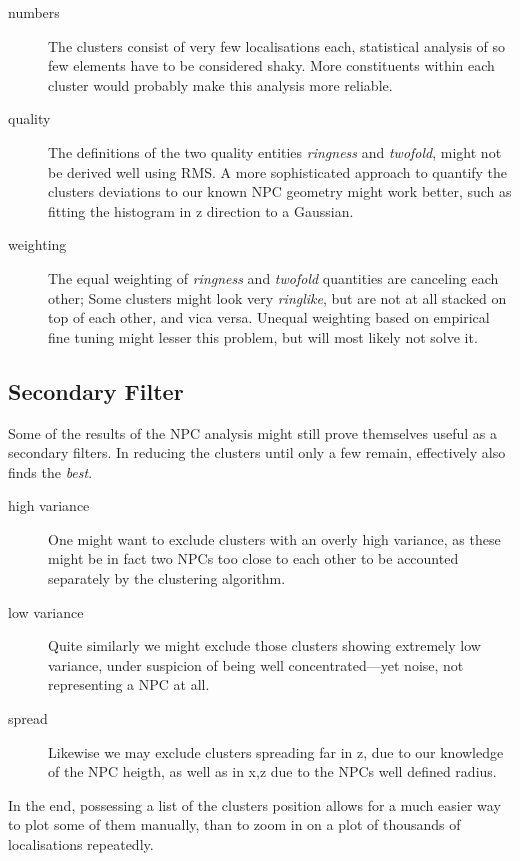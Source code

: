 \documentclass[11pt, a4paper, oneside, twocolumn]{report}
\newcommand{\e}{\emph}
\begin{document}
\begin{description}
\item [numbers] The clusters consist of very few localisations each,
  statistical analysis of so few elements have to be considered
  shaky. More constituents within each cluster would probably make
  this analysis more reliable.
\item [quality] The definitions of the two quality entities
  \e{ringness} and \e{twofold}, might not be derived well using RMS. A
  more sophisticated approach to quantify the clusters deviations to
  our known NPC geometry might work better, such as fitting the
  histogram in z direction to a Gaussian.
\item [weighting] The equal weighting of \e{ringness} and \e{twofold}
  quantities are canceling each other; Some clusters might look very
  \e{ringlike}, but are not at all stacked on top of each other, and
  vica versa. Unequal weighting based on empirical fine tuning might
  lesser this problem, but will most likely not solve it.
\end{description}

\subsection{Secondary Filter}

Some of the results of the NPC analysis might still prove themselves
useful as a secondary filters. In reducing the clusters until only a
few remain, effectively also finds the \e{best}.

\begin{description}
\item [high variance] One might want to exclude clusters with an
  overly high variance, as these might be in fact two NPCs too close
  to each other to be accounted separately by the clustering
  algorithm.
\item [low variance] Quite similarly we might exclude those clusters
  showing extremely low variance, under suspicion of being well
  concentrated---yet noise, not representing a NPC at all.
\item [spread] Likewise we may exclude clusters spreading far in z,
  due to our knowledge of the NPC heigth, as well as in x,z due to the
  NPCs well defined radius.
\end{description}

In the end, possessing a list of the clusters position allows for a
much easier way to plot some of them manually, than to zoom in on a
plot of thousands of localisations repeatedly.
\end{document}
